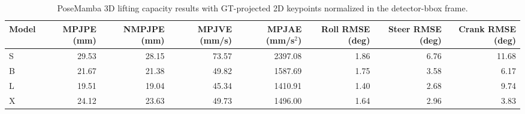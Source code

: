 \begin{table}[t]
\centering
\caption{PoseMamba 3D lifting capacity results with GT-projected 2D keypoints normalized in the detector-bbox frame.}
\begin{tabular}{lrrrrrrr}
\toprule
Model & MPJPE (mm) & NMPJPE (mm) & MPJVE (mm/s) & MPJAE (mm/s$^2$) & Roll RMSE (deg) & Steer RMSE (deg) & Crank RMSE (deg) \\
\midrule
S & 29.53 & 28.15 & 73.57 & 2397.08 & 1.86 & 6.76 & 11.68 \\
B & 21.67 & 21.38 & 49.82 & 1587.69 & 1.75 & 3.58 & 6.17 \\
L & 19.51 & 19.04 & 45.34 & 1410.91 & 1.40 & 2.68 & 9.74 \\
X & 24.12 & 23.63 & 49.73 & 1496.00 & 1.64 & 2.96 & 3.83 \\
\bottomrule
\end{tabular}
\end{table}